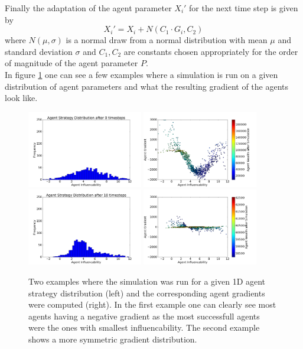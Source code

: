 \documentclass[11pt]{article}
\begin{document}
Finally the adaptation of the agent parameter $X_i'$ for the next time step is given by
\begin{equation}
  X_i' = X_i + N(C_1\cdot G_i, C_2)
\end{equation}
where $N(\mu, \sigma)$ is a normal draw from a normal distribution with mean $\mu$ and standard deviation $\sigma$ and $C_1,C_2$ are constants chosen appropriately for the order of magnitude of the agent parameter $P$. \\
In figure \ref{fig:heuristicgradient} one can see a few examples where a simulation is run on a given distribution of agent parameters and what the resulting gradient of the agents look like.
\begin{figure}
  \centering
  \quad
  \includegraphics[width=0.45\textwidth]{figures/heuristic_gradient_example_1.png}
  \includegraphics[width=0.45\textwidth]{figures/heuristic_gradient_example_2.png}
  \includegraphics[width=0.45\textwidth]{figures/heuristic_gradient_example_3.png}
  \includegraphics[width=0.45\textwidth]{figures/heuristic_gradient_example_4.png}
  \caption[Examples Heuristic Gradient]{Two examples where the simulation was run for a given 1D agent strategy distribution (left) and the corresponding agent gradients were computed (right). In the first example one can clearly see most agents having a negative gradient as the most successfull agents were the ones with smallest influencability. The second example shows a more symmetric gradient distribution.}
  \label{fig:heuristicgradient}
\end{figure}
\end{document}
